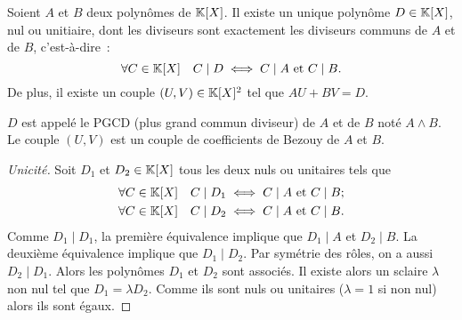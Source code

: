 \begin{prop}
  Soient \(A\) et \(B\) deux polynômes de \(\mathbb{K}[X]\). Il existe un unique polynôme \(D \in \mathbb{K}[X]\), nul ou unitiaire, dont les diviseurs sont exactement les diviseurs communs de \(A\) et de \(B\), c'est-à-dire~:
  \begin{equation}
    \forall C \in \mathbb{K}[X] \quad C\mid{}D \iff C\mid{}A \text{~et~} C\mid{}B.
  \end{equation}
  De plus, il existe un couple \((U,V) \in \mathbb{K}[X]^2\) tel que \(AU+BV=D\).

  \(D\) est appelé le PGCD (plus grand commun diviseur) de \(A\) et de \(B\) noté \(A \wedge B\). Le couple \((U,V)\) est un couple de coefficients de Bezouy de \(A\) et \(B\).
\end{prop}
\begin{proof}[Unicité]
  Soit \(D_1\) et \(D_2 \in \mathbb{K}[X]\) tous les deux nuls ou unitaires tels que
\begin{align}
    \forall C \in \mathbb{K}[X] \quad C\mid{}D_1 &\iff C\mid{}A \text{~et~} C\mid{}B; \\
    \forall C \in \mathbb{K}[X] \quad C\mid{}D_2 &\iff C\mid{}A \text{~et~} C\mid{}B.
  \end{align}
  Comme \(D_1\mid{}D_1\), la première équivalence implique que \(D_1\mid{}A\) et \(D_2\mid{}B\). La deuxième équivalence implique que \(D_1\mid{}D_2\). Par symétrie des rôles, on a aussi \(D_2\mid{}D_1\). Alors les polynômes \(D_1\) et \(D_2\) sont associés. Il existe alors un sclaire \(\lambda\) non nul tel que \(D_1=\lambda D_2\). Comme ils sont nuls ou unitaires (\(\lambda=1\) si non nul) alors ils sont égaux.
\end{proof}
